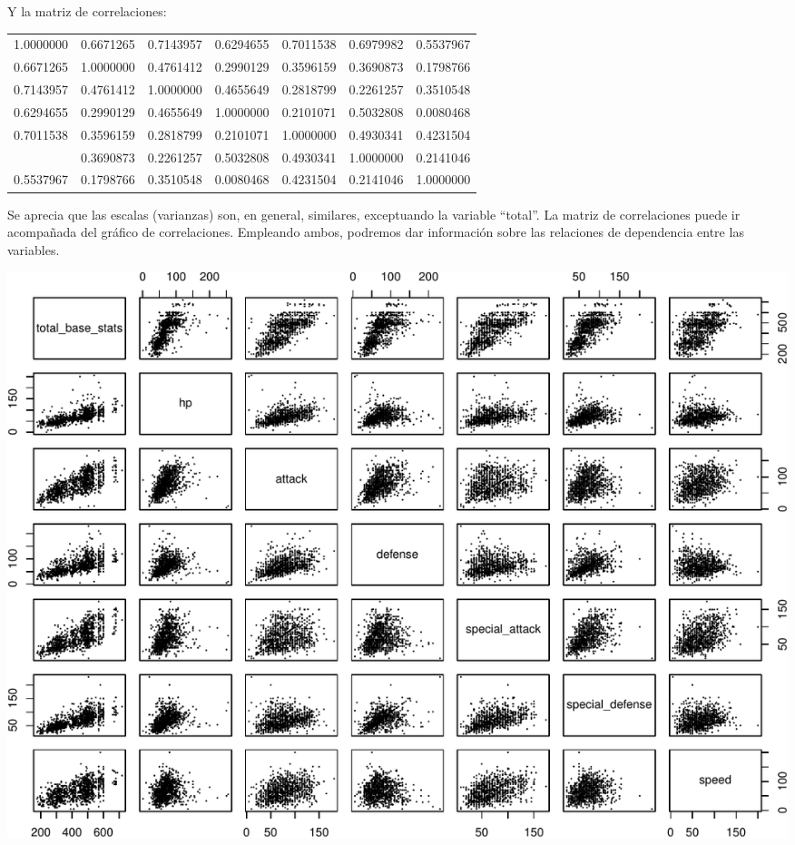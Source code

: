 \documentclass[
  12pt,
]{extreport}
\begin{document}
Y la matriz de correlaciones:

\begin{table}[H]
\centering\begingroup\fontsize{9}{11}\selectfont

\begin{tabular}{rrrrrrr}
\toprule
1.0000000 & 0.6671265 & 0.7143957 & 0.6294655 & 0.7011538 & 0.6979982 & 0.5537967\\
0.6671265 & 1.0000000 & 0.4761412 & 0.2990129 & 0.3596159 & 0.3690873 & 0.1798766\\
0.7143957 & 0.4761412 & 1.0000000 & 0.4655649 & 0.2818799 & 0.2261257 & 0.3510548\\
0.6294655 & 0.2990129 & 0.4655649 & 1.0000000 & 0.2101071 & 0.5032808 & 0.0080468\\
0.7011538 & 0.3596159 & 0.2818799 & 0.2101071 & 1.0000000 & 0.4930341 & 0.4231504\\
\addlinespace
0.6979982 & 0.3690873 & 0.2261257 & 0.5032808 & 0.4930341 & 1.0000000 & 0.2141046\\
0.5537967 & 0.1798766 & 0.3510548 & 0.0080468 & 0.4231504 & 0.2141046 & 1.0000000\\
\bottomrule
\end{tabular}
\endgroup{}
\end{table}

Se aprecia que las escalas (varianzas) son, en general, similares,
exceptuando la variable ``total''. La matriz de correlaciones puede ir
acompañada del gráfico de correlaciones. Empleando ambos, podremos dar
información sobre las relaciones de dependencia entre las variables.

\begin{center}
\includegraphics{trabajo_files/figure-pdf/unnamed-chunk-10-1.pdf}
\end{center}
\end{document}
